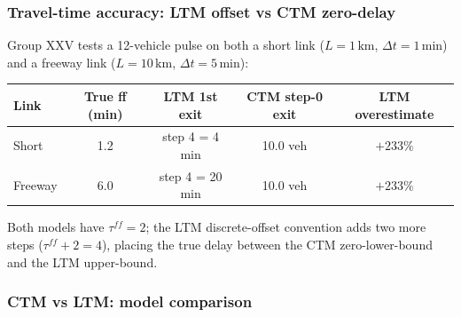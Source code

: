 \subsubsection{Travel-time accuracy: LTM offset vs CTM zero-delay}

Group XXV tests a 12-vehicle pulse on both a short link
($L=1\,\text{km}$, $\Delta t=1\,\text{min}$) and a freeway link
($L=10\,\text{km}$, $\Delta t=5\,\text{min}$):
\begin{center}
\begin{tabular}{lcccc}
\toprule
Link & True ff (min) & LTM 1st exit & CTM step-0 exit & LTM overestimate \\
\midrule
Short  & 1.2 & step 4 = 4 min   & 10.0 veh & $+233\%$ \\
Freeway & 6.0 & step 4 = 20 min & 10.0 veh & $+233\%$ \\
\bottomrule
\end{tabular}
\end{center}
Both models have $\tau^{ff}=2$; the LTM discrete-offset convention adds
two more steps ($\tau^{ff}+2 = 4$), placing the true delay between
the CTM zero-lower-bound and the LTM upper-bound.

\subsubsection{CTM vs LTM: model comparison}
\label{sec:traffic-ctm-ltm-comparison}

